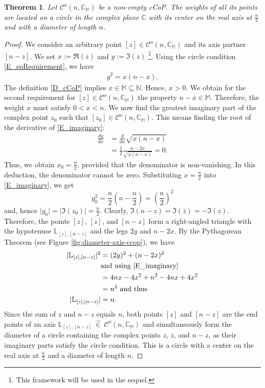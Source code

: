 \documentclass[12pt]{amsart}
\newtheorem{theorem}{Theorem}[section]
\theoremstyle{definition}
\theoremstyle{remark}
\numberwithin{equation}{section}
\newcommand{\abs}[1]{\lvert#1\rvert}
\newcommand{\inn}{~ \hat{\in}~ }
\newcommand{\C}{\mathcal{C}}
\newcommand{\CC}{\mathbb{C}}
\newcommand{\M}{\mathbb{M}}
\newcommand{\N}{\mathbb{N}}
\newcommand{\LL}{\mathbb{L}}
\begin{document}
\begin{theorem}\label{T_cCoPonCircle}
Let $\C^o(n, \CC_{\M})$ be a non-empty cCoP. The weights of all its points are located on a circle in the complex plane $\CC$ with its center on the real axis at $\frac{n}{2}$ and with a diameter of length $n$.
\end{theorem}

\begin{proof}
We consider an arbitrary point $[z] \in \C^o(n, \CC_{\M})$ and its axis partner $[n-z]$. We set $x:=\Re(z)$ and $y:=\Im(z)$
\footnote{This framework will be used in the sequel.}. Using the circle condition \eqref{E_spRequirement}, we have
\begin{align}\label{E_imaginary}
y^2=x(n-x).
\end{align}
The definition \ref{D_cCoP} implies $x\in \M \subseteq \N$. Hence, $x>0$. We obtain for the second requirement for $[z]\in \C^o(n,\CC_{\M})$ the property $n-x\in \M$. Therefore, the weight $x$ must satisfy $0<x<n$. We now find the greatest imaginary part of the complex point $z_0$ such that $[z_0]\in \C^o(n,\CC_{\M})$. This means finding the root of the derivative of \eqref{E_imaginary}:
\begin{align*}
\frac{dy}{dx}&=\frac{d}{dx}\sqrt{x(n-x)} \\
&=\frac{1}{2}\frac{n-2x}{\sqrt{x(n-x)}}=0.
\end{align*}
Thus, we obtain $x_0=\frac{n}{2}$, provided that the denominator is non-vanishing. In this deduction, the denominator cannot be zero. Substituting $x=\frac{n}{2}$ into \eqref{E_imaginary}, we get
\[
y_0^2=\frac{n}{2}\left(n-\frac{n}{2}\right)=\left(\frac{n}{2}\right)^2
\]
and, hence $\abs{y_0}=\abs{\Im(z_0)}=\frac{n}{2}$. Clearly, $\Im(n-z)=\Im(\overline{z})=-\Im(z)$. Therefore, the points $[z]$, $\overline{[z]}$, and $[n-z]$ form a right-angled triangle with the hypotenuse $\LL_{[z], [n-z]}$ and the legs $2y$ and $n-2x$. By the Pythagorean Theorem (see Figure \ref{fig:diameter-axis-ccop}), we have
\begin{align*}
\abs{\LL_{[z], [n-z]}}^2 &=(2y)^2+(n-2x)^2 \\
&\text{and using \eqref{E_imaginary}} \\
&=4nx-4x^2+n^2-4nx+4x^2 \\
&=n^2\text{ and thus} \\
\abs{\LL_{[z],[n-z]}}&= n.
\end{align*}
Since the sum of $z$ and $n-z$ equals $n$, both points $[z]$ and $[n-z]$ are the end points of an axis $\LL_{[z],[n-z]}\inn \C^o(n, \CC_{\M})$ and simultaneously form the diameter of a circle containing the complex points $z$, $\overline{z}$, and $n-z$, as their imaginary parts satisfy the circle condition. This is a circle with a center on the real axis at $\frac{n}{2}$ and a diameter of length $n$.
\end{proof}
\bigskip
\end{document}
